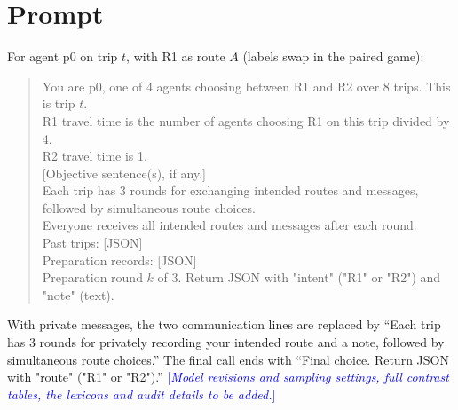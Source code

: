 \documentclass[11pt]{article}
\newcommand{\pending}[1]{\textcolor{blue}{[\textit{#1}]}}
\begin{document}


\appendix
\section{Prompt}
\label{app:prompts}
For agent p0 on trip $t$, with R1 as route $A$ (labels swap in the paired game):
\begin{quote}\small\ttfamily
You are p0, one of 4 agents choosing between R1 and R2 over 8 trips. This is trip $t$.\\
R1 travel time is the number of agents choosing R1 on this trip divided by 4.\\
R2 travel time is 1.\\
{[}Objective sentence(s), if any.{]}\\
Each trip has 3 rounds for exchanging intended routes and messages, followed by simultaneous route choices.\\
Everyone receives all intended routes and messages after each round.\\
Past trips: {[}JSON{]}\\
Preparation records: {[}JSON{]}\\
Preparation round $k$ of 3. Return JSON with "intent" ("R1" or "R2") and "note" (text).
\end{quote}
With private messages, the two communication lines are replaced by ``Each trip has 3 rounds for privately recording your intended route and a note, followed by simultaneous route choices.'' The final call ends with ``Final choice. Return JSON with "route" ("R1" or "R2").'' \pending{Model revisions and sampling settings, full contrast tables, the lexicons and audit details to be added.}
\end{document}
